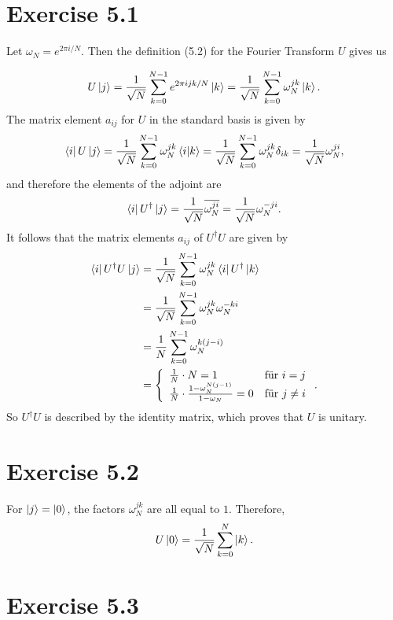 \documentclass{article}
\begin{document}
\section{Exercise 5.1}

Let $\omega_N = e^{2\pi i / N}$. Then the definition (5.2) for the Fourier Transform $U$ gives us

\[
U\ket{j} = 
\frac{1}{\sqrt N} \sum_{k=0}^{N-1} e^{2\pi i jk / N} \ket{k} = 
\frac{1}{\sqrt N} \sum_{k=0}^{N-1} \omega_N^{jk} \ket{k}.
\]
The matrix element $a_{ij}$ for $U$ in the standard basis is given by
\[
\bra{i} U\ket{j} = 
\frac{1}{\sqrt N} \sum_{k=0}^{N-1} \omega_N^{jk} \bra{i}\ket{k} = 
\frac{1}{\sqrt N} \sum_{k=0}^{N-1} \omega_N^{jk} \delta_{ik} = 
\frac{1}{\sqrt N} \omega_N^{ji}, 
\]
and therefore the elements of the adjoint are
\[
\bra{i} U^{\dagger}\ket{j} = 
\frac{1}{\sqrt N} \overline{\omega_N^{ji}} = 
\frac{1}{\sqrt N} \omega_N^{-ji}.
\]
It follows that the matrix elements $a_{ij}$ of $U^{\dagger} U$ are given by
\begin{align*}
\bra{i} U^{\dagger} U \ket{j} 
&= \frac{1}{\sqrt N} \sum_{k=0}^{N-1} \omega_N^{jk} \bra{i} U^{\dagger} \ket{k} \\
&= \frac{1}{\sqrt N} \sum_{k=0}^{N-1} \omega_N^{jk} \omega_N^{-ki} \\
&= \frac{1}{N} \sum_{k=0}^{N-1} \omega_N^{k(j-i)} \\
&= \left\{ 
    \begin{array}{ll}
        \frac{1}{N} \cdot N = 1 & \text{für $i=j$} \\
        \frac{1}{N} \cdot \frac{1-\omega_N^{N(j-1)}}{1-\omega_N} = 0 & \text{für $j\not=i$}
    \end{array}
    \right..
\end{align*}
So $U^{\dagger} U$ is described by the identity matrix, which proves that $U$ is unitary.



\section{Exercise 5.2}

For $\ket{j} = \ket{0}$, the factors $\omega_N^{jk}$ are all equal to $1$. Therefore, 
\[
    U\ket{0} = \frac{1}{\sqrt{N}} \sum_{k=0}^N \ket{k}.
\]

\section{Exercise 5.3}
\end{document}
